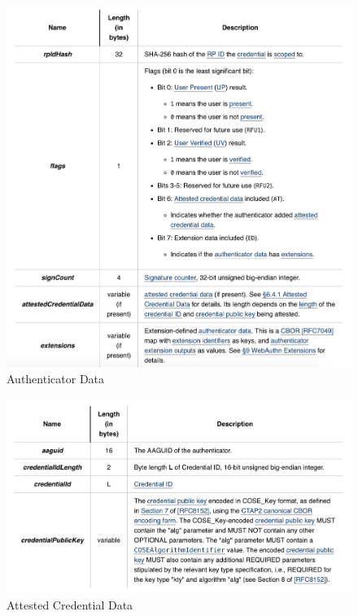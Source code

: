 \documentclass[a4paper, 11pt]{scrartcl}
\begin{document}
\begin{figure}[ht]
  \includegraphics[width=16cm]{img/authenticatorResponseData.png}
  \centering
  \caption{Authenticator Data}
  \label{fig:authenticatorData}
\end{figure}

\begin{figure}[ht]
  \includegraphics[width=16cm]{img/authenticatorData.png}
  \centering
  \caption{Attested Credential Data}
  \label{fig:credentialData}
\end{figure}
\end{document}
